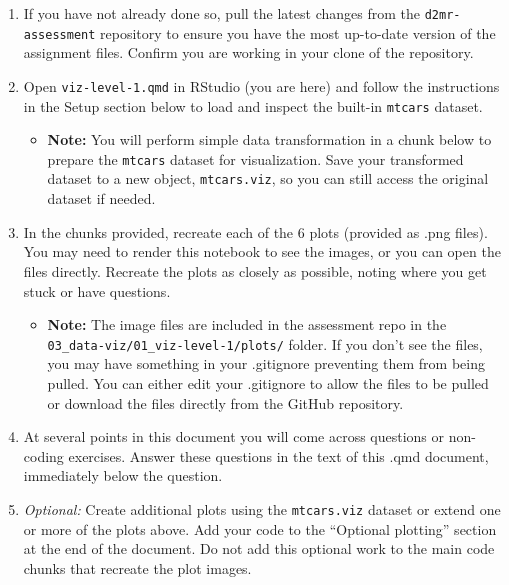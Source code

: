 \documentclass[
  man,
  floatsintext,
  longtable,
  nolmodern,
  notxfonts,
  notimes,
  colorlinks=true,linkcolor=blue,citecolor=blue,urlcolor=blue]{apa7}
\providecommand{\tightlist}{%
  \setlength{\itemsep}{0pt}\setlength{\parskip}{0pt}}
\begin{document}
\begin{enumerate}
\def\labelenumi{\arabic{enumi}.}
\tightlist
\item
  If you have not already done so, pull the latest changes from the
  \texttt{d2mr-assessment} repository to ensure you have the most
  up-to-date version of the assignment files. Confirm you are working in
  your clone of the repository.
\item
  Open \texttt{viz-level-1.qmd} in RStudio (you are here) and follow the
  instructions in the Setup section below to load and inspect the
  built-in \texttt{mtcars} dataset.

  \begin{itemize}
  \tightlist
  \item
    \textbf{Note:} You will perform simple data transformation in a
    chunk below to prepare the \texttt{mtcars} dataset for
    visualization. Save your transformed dataset to a new object,
    \texttt{mtcars.viz}, so you can still access the original dataset if
    needed.
  \end{itemize}
\item
  In the chunks provided, recreate each of the 6 plots (provided as .png
  files). You may need to render this notebook to see the images, or you
  can open the files directly. Recreate the plots as closely as
  possible, noting where you get stuck or have questions.

  \begin{itemize}
  \tightlist
  \item
    \textbf{Note:} The image files are included in the assessment repo
    in the \texttt{03\_data-viz/01\_viz-level-1/plots/} folder. If you
    don't see the files, you may have something in your .gitignore
    preventing them from being pulled. You can either edit your
    .gitignore to allow the files to be pulled or download the files
    directly from the GitHub repository.
  \end{itemize}
\item
  At several points in this document you will come across questions or
  non-coding exercises. Answer these questions in the text of this .qmd
  document, immediately below the question.
\item
  \emph{Optional:} Create additional plots using the \texttt{mtcars.viz}
  dataset or extend one or more of the plots above. Add your code to the
  ``Optional plotting'' section at the end of the document. Do not add
  this optional work to the main code chunks that recreate the plot
  images.
\end{enumerate}
\end{document}
